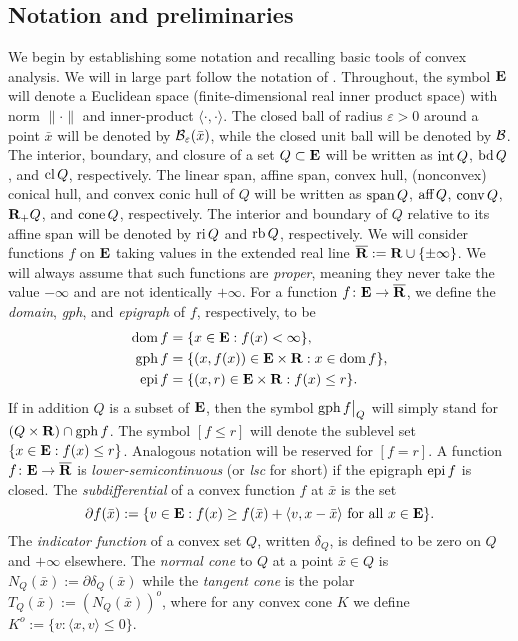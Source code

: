 \documentclass[smallextended,numbook]{svjour3}
\begin{document}
\subsection{Notation and preliminaries}
We begin by establishing some notation and recalling basic tools of convex analysis. We will in large part follow the notation of \cite{con_ter}.
Throughout, the symbol ${{\bf E}}$ will denote a Euclidean space (finite-dimensional real inner product space) with norm $\|\cdot\|$ and inner-product $\langle \cdot,\cdot \rangle$. The closed ball of radius ${\varepsilon} >0$ around a point $\bar{x}$ will be denoted by ${{\cal B}}_{\varepsilon}(\bar{x})$, while the closed unit ball will be denoted by ${\bf{{\cal B}}}$. The interior, boundary, and closure of a set $Q\subset{{\bf E}}$ will be written as ${\mbox{\rm int}\,} Q$, ${\mbox{\rm bd}\,} Q$, and ${\mbox{\rm cl}\,} Q$, respectively.
The linear span, affine span, convex hull, (nonconvex) conical hull, and convex conic hull of $Q$   will be written as ${\mbox{\rm span}\,} Q$, ${\mbox{\rm aff}\,} Q$, ${\mbox{\rm conv}\,} Q$, ${{\bf R}}_+ Q$, and ${\mbox{\rm cone}\,} Q$, respectively. The interior and boundary of $Q$ relative to its affine span will be denoted by ${\mbox{\rm ri}\,} Q$ and ${\mbox{\rm rb}\,} Q$, respectively.
We will consider functions $f$ on ${{\bf E}}$ taking values in the extended real line $\overline{{\bf R}}:={{\bf R}}\cup\{\pm\infty\}$. We will always assume that such functions are {\em proper}, meaning  they never take the value $-\infty$ and are not identically $+\infty$.
For a function $f\colon{{\bf E}}\to\overline{{\bf R}}$, we define the {\em domain},  {\em gph}, and {\em epigraph} of $f$, respectively, to be
\begin{align*}
{\mbox{\rm dom}\,} f &= \{x\in{{\bf E}}: f(x) <\infty\},\\
{\mbox{\rm gph}\,} f &= \{(x,f(x))\in {{\bf E}}\times{{\bf R}} : x\in{\mbox{\rm dom}\,} f\},\\
{\mbox{\rm epi}\,} f &= \{(x,r)\in {{\bf E}}\times{{\bf R}} : f(x)\leq r\}.
\end{align*}
If in addition $Q$ is a subset of ${{\bf E}}$, then the symbol ${\mbox{\rm gph}\,} f\big|_Q$ will simply stand for $(Q\times {{\bf R}})\cap {\mbox{\rm gph}\,} f$.
The symbol $[f\leq r]$ will denote the sublevel set $\{x\in {{\bf E}} : f(x)\leq r\}$. Analogous notation will be reserved for $[f=r]$.
A function $f\colon{{\bf E}}\to\overline{{\bf R}}$ is {\em lower-semicontinuous} (or {\em lsc} for short) if the epigraph ${\mbox{\rm epi}\,} f$ is closed. The {\em subdifferential} of a convex function $f$ at $\bar{x}$ is the set
$$\partial f(\bar{x}):=\{v\in{{\bf E}}: f(x)\geq f(\bar{x})+\langle v,x-\bar{x}\rangle \textrm{ for all }x\in {{\bf E}}\}.$$
The {\em indicator function} of a convex set $Q$, written $\delta_Q$, is defined to be zero on $Q$ and $+\infty$ elsewhere. The {\em normal cone} to $Q$ at a point $\bar{x}\in Q$ is $N_Q(\bar{x}):=\partial \delta_{Q}(\bar{x})$ while the {\em tangent cone} is the polar $T_Q(\bar{x}):=(N_Q(\bar{x}))^{o}$, where for any convex cone $K$ we define $K^{o}:=\{v:\langle x,v\rangle\leq 0\}$. 
\end{document}
